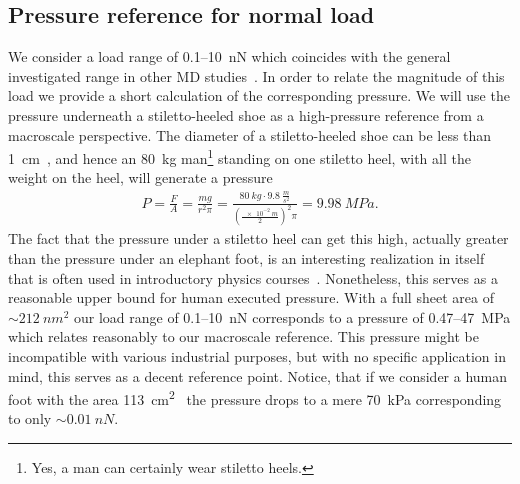 \subsection{Pressure reference for normal load}
We consider a load range of 0.1--\SI{10}{nN} which coincides with the general investigated range in other \acrshort{MD} studies~\cite{li_evolving_2016, zhu_study_2018, zhu_study_2018}. In order to relate the magnitude of this load we provide a short calculation of the corresponding pressure. We will use the pressure underneath a stiletto-heeled shoe as a high-pressure reference from a macroscale perspective. The diameter of a stiletto-heeled
shoe can be less than \SI{1}{cm}~\cite{stiletto_1}, and hence an \SI{80}{kg} man\footnote{Yes, a man can certainly
wear stiletto heels.} standing on one stiletto heel, with all the weight on the heel, will generate a pressure
\begin{align*}
  P = \frac{F}{A} = \frac{mg}{r^2\pi} = \frac{\SI{80}{kg} \cdot \SI{9.8}{\frac{m}{s^2}}}{(\frac{\SI{e-2}{m}}{2})^2 \pi} = \SI{9.98}{MPa}.
\end{align*} 
The fact that the pressure under a stiletto heel can get this high, actually greater than the pressure under an elephant foot, is an interesting realization in itself that is often used in
introductory physics courses~\cite{stiletto_2}. Nonetheless, this serves as a reasonable upper bound for human executed pressure. With
a full sheet area of $\sim \SI{212}{nm^2}$ our load range of 0.1--\SI{10}{nN} corresponds to a pressure of 0.47--\SI{47}{MPa} which relates reasonably to our macroscale reference. This pressure might be incompatible with various industrial purposes, but with no specific application in mind, this serves as a decent reference point. Notice, that if we consider a human foot with the area \SI{113}{cm^2}~\cite{stiletto_3} the pressure drops to a mere \SI{70}{kPa} corresponding to only $\sim \SI{0.01}{nN}$.


